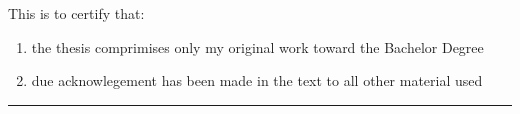 \thispagestyle{empty}
This is to certify that:
\renewcommand{\labelenumi}{\roman{enumi}.}
\begin{enumerate}
\item the thesis comprimises only my original work toward the Bachelor Degree
\item due acknowlegement has been made in the text to all other material used
\end{enumerate}
\renewcommand{\labelenumi}{\arabic{enumi}.}

\vspace{2cm}
\begin{flushright}
\rule[0mm]{6cm}{0.2mm}\\
\authorOfThesis\\
\submissionDate\\
\end{flushright}